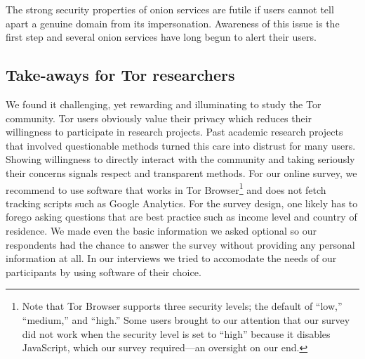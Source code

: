 The strong security properties of onion services are futile if users cannot tell
apart a genuine domain from its impersonation.  Awareness of this issue is the
first step and several onion services have long begun to alert their users.





\subsection{Take-aways for Tor researchers}

We found it challenging, yet rewarding and illuminating to study the Tor
community.  Tor users obviously value their privacy which reduces their
willingness to participate in research projects.  Past academic research
projects that involved questionable methods turned this care into distrust for
many users.  Showing willingness to directly interact with the community and
taking seriously their concerns signals respect and transparent methods.  For
our online survey, we recommend to use software that works in Tor
Browser\footnote{Note that Tor Browser supports three security levels; the
default of ``low,'' ``medium,'' and ``high.''  Some users brought to our
attention that our survey did not work when the security level is set to
``high'' because it disables JavaScript, which our survey required---an
oversight on our end.} and does not fetch tracking scripts such as Google
Analytics.  For the survey design, one likely has to forego asking questions
that are best practice such as income level and country of residence.  We made
even the basic information we asked optional so our respondents had the chance
to answer the survey without providing any personal information at all.  In our
interviews we tried to accomodate the needs of our participants by using
software of their choice.
